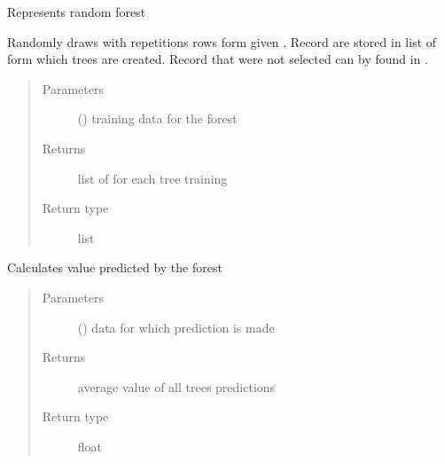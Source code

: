 \documentclass[letterpaper,10pt,english]{sphinxmanual}
\begin{document}
\begin{fulllineitems}
\label{\detokenize{forest:random_forest.forest.Forest}}
Represents random forest

\begin{fulllineitems}
\label{\detokenize{forest:random_forest.forest.Forest.bootstrap}}
Randomly draws with repetitions rows form given .
Record are stored in list of  form which trees are created.
Record that were not selected can by found in .
\begin{quote}\begin{description}
\item[{Parameters}] \leavevmode
{} () \textendash{} training data for the forest

\item[{Returns}] \leavevmode
list of  for each tree training

\item[{Return type}] \leavevmode
list

\end{description}\end{quote}

\end{fulllineitems}


\begin{fulllineitems}
\label{\detokenize{forest:random_forest.forest.Forest.predict}}
Calculates value predicted by the forest
\begin{quote}\begin{description}
\item[{Parameters}] \leavevmode
{} () \textendash{} data for which prediction is made

\item[{Returns}] \leavevmode
average value of all trees predictions

\item[{Return type}] \leavevmode
float

\end{description}\end{quote}

\end{fulllineitems}


\end{fulllineitems}
\end{document}
